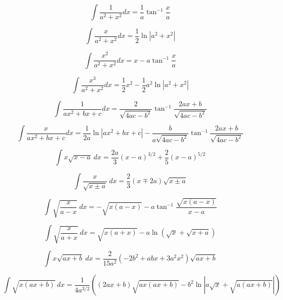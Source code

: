 \tiny
\begin{equation*}
\int \frac{1}{a^2+x^2}dx = \frac{1}{a}\tan^{-1}\frac{x}{a}
\end{equation*}

\begin{equation*}
\int \frac{x}{a^2+x^2}dx = \frac{1}{2}\ln|a^2+x^2|
\end{equation*}

\begin{equation*}
\int \frac{x^2}{a^2+x^2}dx = x-a\tan^{-1}\frac{x}{a}
\end{equation*}

\begin{equation*}
\int \frac{x^3}{a^2+x^2}dx = \frac{1}{2}x^2-\frac{1}{2}a^2\ln|a^2+x^2|
\end{equation*}

\begin{equation*}
\int \frac{1}{ax^2+bx+c}dx = \frac{2}{\sqrt{4ac-b^2}}\tan^{-1}\frac{2ax+b}{\sqrt{4ac-b^2}}
\end{equation*}

\begin{equation*}
\int \frac{x}{ax^2+bx+c}dx = \frac{1}{2a}\ln|ax^2+bx+c| 
-\frac{b}{a\sqrt{4ac-b^2}}\tan^{-1}\frac{2ax+b}{\sqrt{4ac-b^2}}
\end{equation*}

\begin{equation*}
\int x\sqrt{x-a}\ dx =  
\frac{2 a}{3} \left({x-a}\right)^{3/2} +\frac{2 }{5}\left( {x-a}\right)^{5/2} 
\end{equation*}

\begin{equation*}
\int \frac{x}{\sqrt{x\pm a} } \ dx = \frac{2}{3}(x\mp 2a)\sqrt{x\pm a}
\end{equation*}

\begin{equation*}
\int \sqrt{\frac{x}{a-x}}\ dx =  -\sqrt{x(a-x)}
-a\tan^{-1}\frac{\sqrt{x(a-x)}}{x-a}
\end{equation*}

\begin{equation*}
\int \sqrt{\frac{x}{a+x}}\ dx =  \sqrt{x(a+x)} 
-a\ln \left ( \sqrt{x} + \sqrt{x+a}\right ) 
\end{equation*}

\begin{equation*}
\int x \sqrt{ax + b}\ dx =
\frac{2}{15 a^2}(-2b^2+abx + 3 a^2 x^2)
\sqrt{ax+b}
\end{equation*}

\begin{equation*}
\int \sqrt{x(ax+b)}\ dx =
 \frac{1}{4a^{3/2}}\left((2ax + b)\sqrt{ax(ax+b)} 
-b^2 \ln \left| a\sqrt{x} + \sqrt{a(ax+b)} \right| \right) 
\end{equation*}

